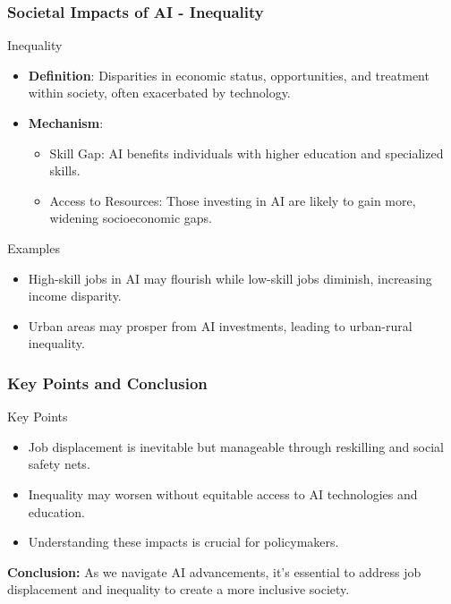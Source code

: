 \documentclass{beamer}
\begin{document}
\begin{frame}[fragile]
    \frametitle{Societal Impacts of AI - Inequality}
    \begin{block}{Inequality}
        \begin{itemize}
            \item \textbf{Definition}: Disparities in economic status, opportunities, and treatment within society, often exacerbated by technology.
            \item \textbf{Mechanism}: 
            \begin{itemize}
                \item Skill Gap: AI benefits individuals with higher education and specialized skills.
                \item Access to Resources: Those investing in AI are likely to gain more, widening socioeconomic gaps.
            \end{itemize}
        \end{itemize}
    \end{block}

    \begin{block}{Examples}
        \begin{itemize}
            \item High-skill jobs in AI may flourish while low-skill jobs diminish, increasing income disparity.
            \item Urban areas may prosper from AI investments, leading to urban-rural inequality.
        \end{itemize}
    \end{block}
\end{frame}

\begin{frame}[fragile]
    \frametitle{Key Points and Conclusion}
    \begin{block}{Key Points}
        \begin{itemize}
            \item Job displacement is inevitable but manageable through reskilling and social safety nets.
            \item Inequality may worsen without equitable access to AI technologies and education.
            \item Understanding these impacts is crucial for policymakers.
        \end{itemize}
    \end{block}

    \textbf{Conclusion:} As we navigate AI advancements, it's essential to address job displacement and inequality to create a more inclusive society.
\end{frame}
\end{document}
